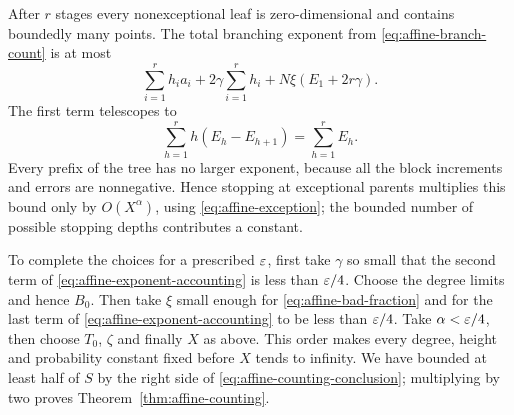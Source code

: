 After $r$ stages every nonexceptional leaf is zero-dimensional and
contains boundedly many points.  The total branching exponent from
\eqref{eq:affine-branch-count} is at most
\begin{equation}\label{eq:affine-exponent-accounting}
 \sum_{i=1}^r h_i a_i
 +2\gamma\sum_{i=1}^r h_i
 +N\xi(E_1+2r\gamma).
\end{equation}
The first term telescopes to
\[
 \sum_{h=1}^r h(E_h-E_{h+1})=\sum_{h=1}^r E_h.
\]
Every prefix of the tree has no larger exponent, because all the
block increments and errors are nonnegative.  Hence stopping at
exceptional parents multiplies this bound only by $O(X^\alpha)$,
using \eqref{eq:affine-exception}; the bounded number of possible
stopping depths contributes a constant.

To complete the choices for a prescribed $\varepsilon$, first take $\gamma$
so small that the second term of
\eqref{eq:affine-exponent-accounting} is less than $\varepsilon/4$.
Choose the degree limits and hence $B_0$.  Then take $\xi$ small
enough for \eqref{eq:affine-bad-fraction} and for the last term of
\eqref{eq:affine-exponent-accounting} to be less than $\varepsilon/4$.
Take $\alpha<\varepsilon/4$, then choose $T_0$, $\zeta$ and finally $X$
as above.  This order makes every degree, height and probability
constant fixed before $X$ tends to infinity.  We have bounded at
least half of $S$ by the right side of
\eqref{eq:affine-counting-conclusion}; multiplying by two proves
Theorem~\ref{thm:affine-counting}.
